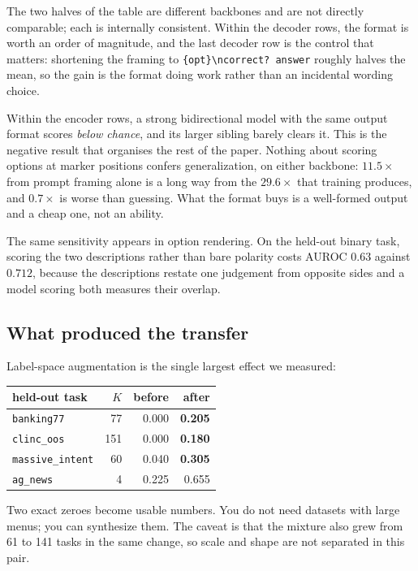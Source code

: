 The two halves of the table are different backbones and are not directly
comparable; each is internally consistent. Within the decoder rows, the
format is worth an order of magnitude, and the last decoder row is the
control that matters: shortening the framing to
\texttt{\{opt\}\textbackslash ncorrect? answer} roughly halves the mean,
so the gain is the format doing work rather than an incidental wording
choice.

Within the encoder rows, a strong bidirectional model with the same
output format scores \emph{below chance}, and its larger sibling barely
clears it. This is the negative result that organises the rest of the
paper. Nothing about scoring options at marker positions confers
generalization, on either backbone: $11.5\times$ from prompt framing
alone is a long way from the $29.6\times$ that training produces, and
$0.7\times$ is worse than guessing. What the format buys is a well-formed
output and a cheap one, not an ability.

The same sensitivity appears in option rendering. On the held-out binary
task, scoring the two \noul{} descriptions rather than bare polarity costs
AUROC $0.63$ against $0.712$, because the descriptions restate one
judgement from opposite sides and a model scoring both measures their
overlap.

\subsection{What produced the transfer}
\label{sec:res-data}

Label-space augmentation is the single largest effect we measured:

\begin{center}
\begin{tabular}{lrrr}
\toprule
held-out task & $K$ & before & after \\
\midrule
\texttt{banking77}       &  77 & 0.000 & \textbf{0.205} \\
\texttt{clinc\_oos}      & 151 & 0.000 & \textbf{0.180} \\
\texttt{massive\_intent} &  60 & 0.040 & \textbf{0.305} \\
\texttt{ag\_news}        &   4 & 0.225 & 0.655 \\
\bottomrule
\end{tabular}
\end{center}

Two exact zeroes become usable numbers. You do not need datasets with
large menus; you can synthesize them. The caveat is that the mixture also
grew from 61 to 141 tasks in the same change, so scale and shape are not
separated in this pair.

